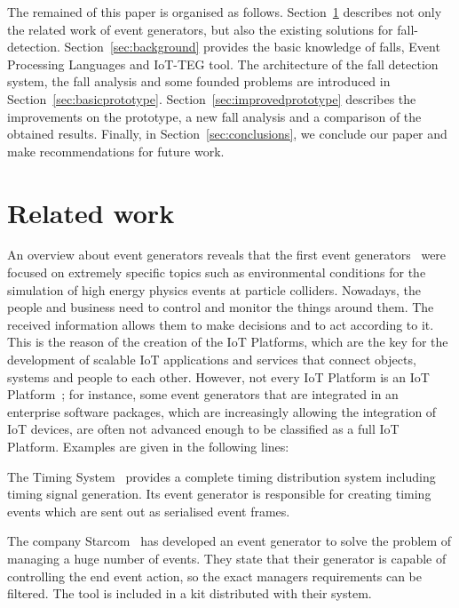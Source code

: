 \documentclass[conference]{IEEEtran}
\theoremstyle{definition}
\begin{document}
The remained of this paper is organised as follows. Section~\ref{sec:relatedwork}
describes not only the related work of event generators, but also the existing
solutions for fall-detection. Section~\ref{sec:background} provides the basic
knowledge of falls, Event Processing Languages and IoT-TEG tool. The architecture
of the fall detection system, the fall analysis and some founded problems are 
introduced in Section~\ref{sec:basicprototype}. Section~\ref{sec:improvedprototype}
describes the improvements on the prototype, a new fall analysis and
a comparison of the obtained results. Finally, in Section~\ref{sec:conclusions}, 
we conclude our paper and make recommendations for future work.

\section{Related work}
\label{sec:relatedwork}

An overview about event generators reveals that the first event generators~\cite{dobbs2004houches,mangano2005tools} were focused on 
extremely specific topics such as environmental conditions for the simulation of high energy physics events at particle colliders. Nowadays,
the people and business need to control and monitor the things around them. The received information allows them
to make decisions and to act according to it. This is the reason of the creation of the IoT Platforms, which are the
key for the development of scalable IoT applications and services that connect objects, systems and people to each other.
However, not every IoT Platform is an IoT Platform~\cite{iot-analytics:2015}; for instance, some event generators that are integrated in an
enterprise software packages, which are increasingly allowing the integration of IoT devices, are often not advanced enough
to be classified as a full IoT Platform. Examples are given in the following lines:

The Timing System~\cite{Finland:2016} provides a complete timing distribution system including timing signal generation. Its event
generator is responsible for creating timing events which are sent out as serialised event frames.

The company Starcom~\cite{Starcom:2016} has developed an event generator to solve the problem of managing a huge number of
events. They state that their generator is capable of controlling the end event action, so the exact managers requirements can
be filtered. The tool is included in a kit distributed with their system.
\end{document}
